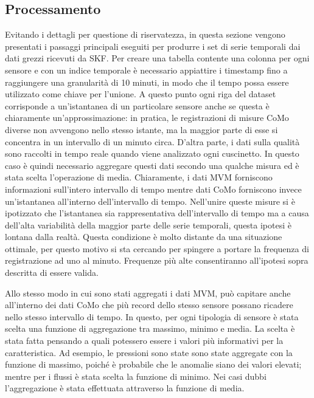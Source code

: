 \subsection{Processamento}
Evitando i dettagli per questione di riservatezza, in questa sezione vengono presentati i passaggi principali eseguiti per produrre i set di serie temporali dai dati grezzi ricevuti da SKF. 
Per creare una tabella contente una colonna per ogni sensore e con un indice temporale è necessario appiattire i timestamp fino a raggiungere una granularità di 10 minuti, in modo che il tempo possa essere utilizzato come chiave per l'unione. A questo punto ogni riga del dataset corrisponde a un'istantanea di un particolare sensore anche se questa è chiaramente un'approssimazione: in pratica, le registrazioni di misure CoMo diverse non avvengono nello stesso istante, ma la maggior parte di esse si concentra in un intervallo di un minuto circa. 
D'altra parte, i dati sulla qualità sono raccolti in tempo reale quando viene analizzato ogni cuscinetto. In questo caso è quindi necessario aggregare questi dati secondo una qualche misura ed è stata scelta l'operazione di media.
Chiaramente, i dati MVM forniscono informazioni sull'intero intervallo di tempo mentre dati CoMo forniscono invece un'istantanea all'interno dell'intervallo di tempo.
Nell'unire queste misure si è ipotizzato che l'istantanea sia rappresentativa dell'intervallo di tempo ma a causa dell'alta variabilità della maggior parte delle serie temporali, questa ipotesi è lontana dalla realtà.
Questa condizione è molto distante da una situazione ottimale, per questo motivo si sta cercando per spingere a portare la frequenza di registrazione ad uno al minuto. Frequenze più alte consentiranno all'ipotesi sopra descritta di essere valida.

Allo stesso modo in cui sono stati aggregati i dati MVM, può capitare anche all'interno dei dati CoMo che più record dello stesso sensore possano ricadere nello stesso intervallo di tempo. In questo, per ogni tipologia di sensore è stata scelta una funzione di aggregazione tra massimo, minimo e media. La scelta è stata fatta pensando a quali potessero essere i valori più informativi per la caratteristica. Ad esempio, le pressioni sono state sono state aggregate con la funzione di massimo, poiché è probabile che le anomalie siano dei valori elevati; mentre per i flussi è stata scelta la funzione di minimo. Nei casi dubbi l'aggregazione è stata effettuata attraverso la funzione di media.

